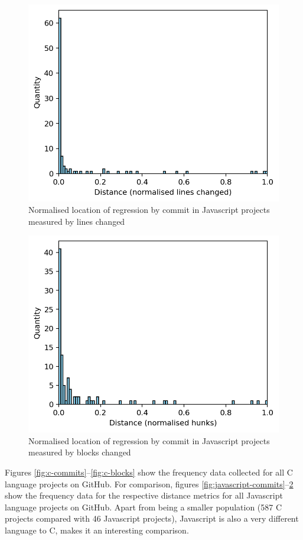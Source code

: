 \documentclass[pdflatex, sn-mathphys, referee]{sn-jnl}%
\theoremstyle{thmstyleone}%
\theoremstyle{thmstyletwo}%
\theoremstyle{thmstylethree}%
\theoremstyle{thmstyleone}
\begin{document}
\begin{figure}[t]
\centering
\includegraphics[width=0.7\columnwidth]{Fig12}%
\caption{\label{fig:javascript-lines}Normalised location of regression by commit in Javascript projects measured by lines changed}
\end{figure}

\begin{figure}[t]
\centering
\includegraphics[width=0.7\columnwidth]{Fig13}%
\caption{\label{fig:javascript-blocks}Normalised location of regression by commit in Javascript projects measured by blocks changed}
\end{figure}

Figures \ref{fig:c-commits}--\ref{fig:c-blocks} show the frequency data collected for all C language projects on GitHub. For comparison, figures \ref{fig:javascript-commits}--\ref{fig:javascript-blocks} show the frequency data for the respective distance metrics for all Javascript language projects on GitHub. Apart from being a smaller population (587 C projects compared with 46 Javascript projects), Javascript is also a very different language to C, makes it an interesting comparison.
\end{document}
